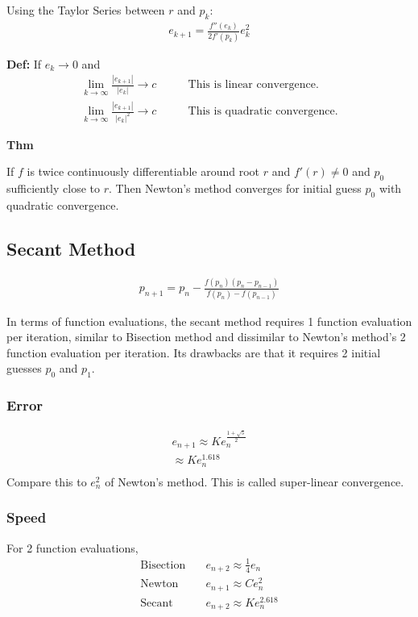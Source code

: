 \documentclass[12pt, letterpaper]{article}
\begin{document}
Using the Taylor Series between $r$ and $p_k$:
\begin{align*}
    e_{k+1} = \frac{f''(e_k)}{2f'(p_k)} e_k^2 
\end{align*}

\noindent \textbf{Def:} If $e_k \rightarrow 0$ and
\begin{align*}
    \lim_{k \to \infty} \frac{|e_{k+1}|}{|e_k|} \rightarrow c &\qquad \text{This is linear convergence.} \\
    \lim_{k \to \infty} \frac{|e_{k+1}|}{|e_k|^2} \rightarrow c &\qquad \text{This is quadratic convergence.} 
\end{align*}

\noindent\textbf{Thm}

If $f$ is twice continuously differentiable around root $r$ and $f'(r)\ne 0$ and $p_0$ sufficiently close to $r$.
Then Newton's method converges for initial guess $p_0$ with quadratic convergence.

\subsection{Secant Method}

\begin{align*}
    p_{n+1}=p_n - \frac{f(p_n)(p_n-p_{n-1})}{f(p_n)-f(p_{n-1})}
\end{align*}

In terms of function evaluations, the secant method requires 1 function evaluation per iteration,
similar to Bisection method and dissimilar to Newton's method's 2 function evaluation per iteration. 
Its drawbacks are that it requires 2 initial guesses $p_0$ and $p_1$.

\subsubsection{Error}
\begin{align*}
    e_{n+1} \approx Ke_n^{\frac{1+\sqrt{5}}{2}} \\ 
    \approx Ke_n^{1.618}  \\
\end{align*}
\noindent Compare this to $e_n^2$ of Newton's method. This is called super-linear convergence.

\subsubsection{Speed}
For 2 function evaluations,
\begin{align*}
    \text{Bisection} \quad& e_{n+2} \approx \frac 14 e_n \\
    \text{Newton}    \quad& e_{n+1} \approx C e_n^2 \\
    \text{Secant}    \quad& e_{n+2} \approx K e_n^{2.618}
\end{align*}
\end{document}
